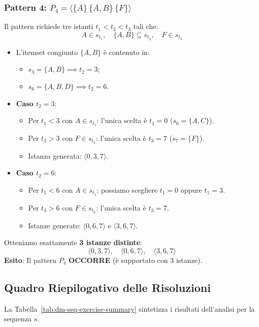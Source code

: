 \subsubsection{Pattern 4: $P_4 = \langle \{A\} \, \{A, B\} \, \{F\} \rangle$}
Il pattern richiede tre istanti $t_1 < t_2 < t_3$ tali che:
\begin{equation*}
A \in s_{t_1}, \quad \{A, B\} \subseteq s_{t_2}, \quad F \in s_{t_3}
\end{equation*}
\begin{itemize}
    \item L'itemset congiunto $\{A, B\}$ è contenuto in:
    \begin{itemize}[noitemsep]
        \item $s_3 = \{A, B\} \implies t_2 = 3$;
        \item $s_6 = \{A, B, D\} \implies t_2 = 6$.
    \end{itemize}
    \item \textbf{Caso $t_2 = 3$}:
    \begin{itemize}[noitemsep]
        \item Per $t_1 < 3$ con $A \in s_{t_1}$: l'unica scelta è $t_1 = 0$ ($s_0 = \{A, C\}$).
        \item Per $t_3 > 3$ con $F \in s_{t_3}$: l'unica scelta è $t_3 = 7$ ($s_7 = \{F\}$).
        \item Istanza generata: $\langle 0, 3, 7 \rangle$.
    \end{itemize}
    \item \textbf{Caso $t_2 = 6$}:
    \begin{itemize}[noitemsep]
        \item Per $t_1 < 6$ con $A \in s_{t_1}$: possiamo scegliere $t_1 = 0$ oppure $t_1 = 3$.
        \item Per $t_3 > 6$ con $F \in s_{t_3}$: l'unica scelta è $t_3 = 7$.
        \item Istanze generate: $\langle 0, 6, 7 \rangle$ e $\langle 3, 6, 7 \rangle$.
    \end{itemize}
\end{itemize}
Otteniamo esattamente \textbf{3 istanze distinte}:
\begin{equation}
\langle 0, 3, 7 \rangle, \quad \langle 0, 6, 7 \rangle, \quad \langle 3, 6, 7 \rangle
\end{equation}
\textbf{Esito}: Il pattern $P_4$ \textbf{OCCORRE} (è supportato con 3 istanze).

\FloatBarrier
\subsection{Quadro Riepilogativo delle Risoluzioni}
La Tabella~\ref{tab:dm-seq-exercise-summary} sintetizza i risultati dell'analisi per la sequenza $s$.

